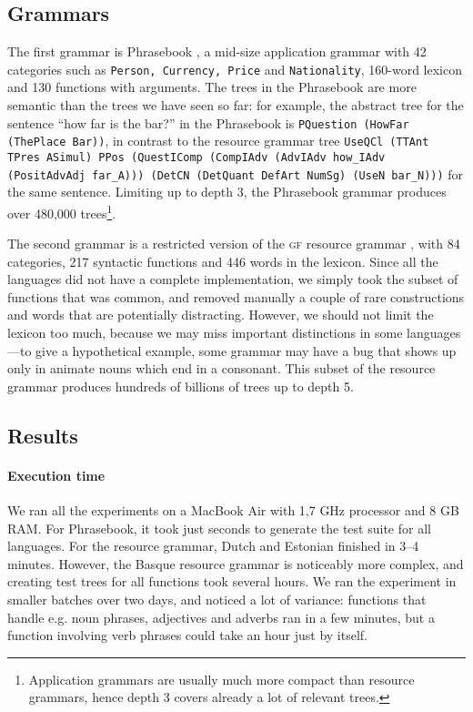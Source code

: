 \documentclass[11pt]{article}
\def\t#1{\texttt{#1}}
\def\gf{\textsc{gf}}
\begin{document}
\subsection{Grammars}

The first grammar is Phrasebook \cite{ranta2010phrasebook}, a mid-size
application grammar with 42 categories such as \t{Person, Currency,
  Price} and \t{Nationality}, 160-word lexicon and 130 functions with
arguments. The trees in the Phrasebook are more semantic than the
trees we have seen so far: for example, the abstract tree for the sentence ``how far is the bar?'' in the Phrasebook is {\tt PQuestion (HowFar (ThePlace Bar))}, in contrast to the resource grammar tree
{\tt \small UseQCl (TTAnt TPres ASimul) PPos (QuestIComp
  (CompIAdv (AdvIAdv how\_IAdv (PositAdvAdj far\_A))) 
  (DetCN (DetQuant DefArt NumSg) (UseN bar\_N)))} for the same
sentence. Limiting up to depth 3, the Phrasebook grammar produces over
480,000 trees\footnote{Application grammars are usually
much more compact than resource grammars, hence depth 3 covers already
a lot of relevant trees.}.

The second grammar is a restricted version of the \gf{} resource
grammar \cite{ranta2009rgl}, with 84 categories, 217 syntactic
functions and 446 words in the lexicon. Since all the languages did
not have a complete implementation, we simply took the subset of functions that was
common, and removed manually a couple of rare constructions and words
that are potentially distracting. However, we should not limit the
lexicon too much, because we may miss important distinctions  in some
languages---to give a hypothetical example, some grammar may have a
bug that shows up only in animate nouns which end in a consonant. This
subset of the resource grammar produces hundreds of billions of trees
up to depth 5.
\subsection{Results}

\paragraph{Execution time} We ran all the experiments on a MacBook Air with 1,7 GHz processor and 8 GB RAM.
For Phrasebook, it took just seconds to generate the test suite for
all languages. For the resource grammar, Dutch and Estonian finished
in 3--4 minutes. However, the Basque resource grammar is noticeably
more complex, and creating test trees for all functions took several
hours. We ran the experiment in smaller batches over two days, and
noticed a lot of variance: functions that handle e.g. noun phrases,
adjectives and adverbs ran in a few minutes, but a function involving
verb phrases could take an hour just by itself. 
\end{document}
